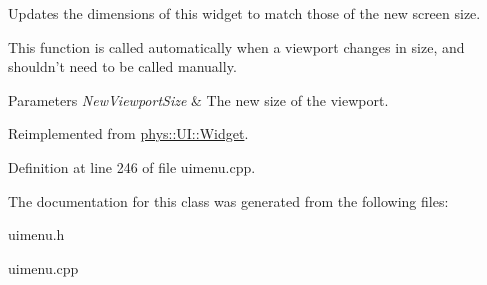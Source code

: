 Updates the dimensions of this widget to match those of the new screen size. 

This function is called automatically when a viewport changes in size, and shouldn't need to be called manually. 
\begin{DoxyParams}{Parameters}
{\em NewViewportSize} & The new size of the viewport. \\
\hline
\end{DoxyParams}


Reimplemented from \hyperlink{classphys_1_1UI_1_1Widget_acbda7003549c6caac46078c034657929}{phys::UI::Widget}.



Definition at line 246 of file uimenu.cpp.



The documentation for this class was generated from the following files:\begin{DoxyCompactItemize}
\item 
uimenu.h\item 
uimenu.cpp\end{DoxyCompactItemize}
